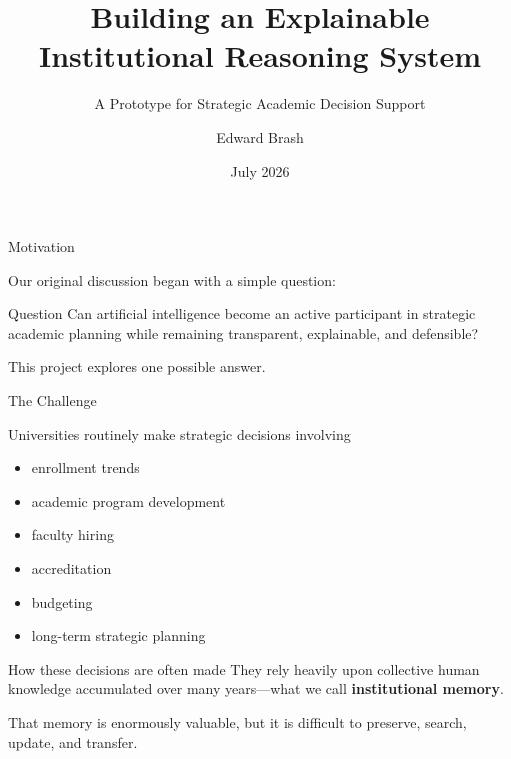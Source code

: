 \documentclass[aspectratio=169]{beamer}
\title{Building an Explainable Institutional Reasoning System}
\subtitle{A Prototype for Strategic Academic Decision Support}
\author{Edward Brash}
\institute{
School of Engineering and Computing\\
Christopher Newport University
}
\date{July 2026}
\begin{document}
\begin{frame}
    \titlepage
\end{frame}

\begin{frame}{Motivation}

\Large

Our original discussion began with a simple question:

\vspace{0.8cm}

\begin{block}{Question}
Can artificial intelligence become an active participant in
strategic academic planning while remaining transparent,
explainable, and defensible?
\end{block}

\vspace{0.8cm}

This project explores one possible answer.

\end{frame}

\begin{frame}{The Challenge}

Universities routinely make strategic decisions involving

\vspace{0.25cm}

\begin{itemize}
\item enrollment trends
\item academic program development
\item faculty hiring
\item accreditation
\item budgeting
\item long-term strategic planning
\end{itemize}

\vspace{0.35cm}

\begin{block}{How these decisions are often made}
They rely heavily upon collective human knowledge accumulated
over many years---what we call \textbf{institutional memory}.
\end{block}

\vspace{0.25cm}

That memory is enormously valuable, but it is difficult to preserve,
search, update, and transfer.

\end{frame}
\end{document}
